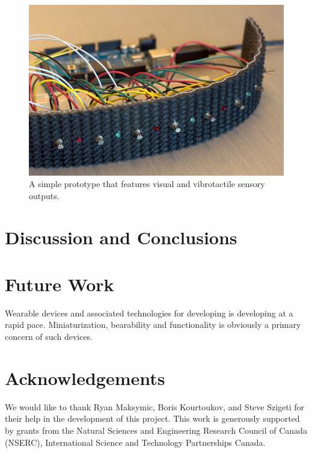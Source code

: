 \documentclass{chi-ext}
\begin{document}
\begin{figure}
  \begin{center}
  \includegraphics[width=\columnwidth]{images/P1130386.jpg}
  \caption{A simple prototype that features visual and vibrotactile sensory outputs.}
  \label{fig:rubberVibeBand01}
  \end{center}  
\end{figure}

\section{Discussion and Conclusions}


\section{Future Work}
Wearable devices and associated technologies for developing is developing at a rapid pace.
Miniaturization, bearability and functionality is obviously a primary concern of such devices. 

\section{Acknowledgements}

We would like to thank Ryan Maksymic, Boris Kourtoukov, and Steve Szigeti for their help in the development of this project. This work is generously supported by grants from the Natural Sciences and Engineering Research Council of Canada (NSERC), International Science and Technology Partnerships Canada.

\balance


\end{document}
